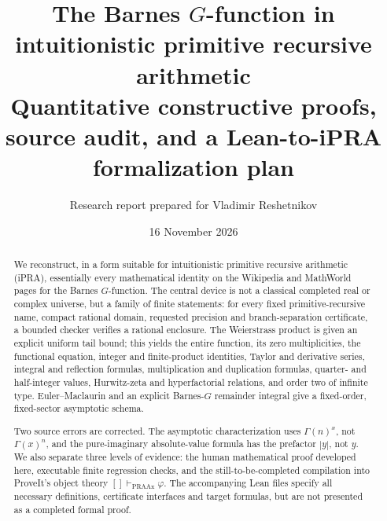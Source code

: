 \documentclass[11pt]{article}
\title{\textbf{The Barnes $G$-function in intuitionistic primitive recursive arithmetic}\\
\large Quantitative constructive proofs, source audit, and a Lean-to-iPRA formalization plan}
\author{Research report prepared for Vladimir Reshetnikov}
\date{16 November 2026}
\begin{document}
\maketitle

\begin{abstract}
We reconstruct, in a form suitable for intuitionistic primitive recursive
arithmetic (iPRA), essentially every mathematical identity on the Wikipedia and
MathWorld pages for the Barnes $G$-function.  The central device is not a
classical completed real or complex universe, but a family of finite statements:
for every fixed primitive-recursive name, compact rational domain, requested
precision and branch-separation certificate, a bounded checker verifies a
rational enclosure.  The Weierstrass product is given an explicit uniform tail
bound; this yields the entire function, its zero multiplicities, the functional
equation, integer and finite-product identities, Taylor and derivative series,
integral and reflection formulas, multiplication and duplication formulas,
quarter- and half-integer values, Hurwitz-zeta and hyperfactorial relations,
and order two of infinite type.  Euler--Maclaurin and an explicit Barnes-$G$
remainder integral give a fixed-order, fixed-sector asymptotic schema.

Two source errors are corrected.  The asymptotic characterization uses
$\Gamma(n)^x$, not $\Gamma(x)^n$, and the pure-imaginary absolute-value formula
has the prefactor $|y|$, not $y$.  We also separate three levels of evidence:
the human mathematical proof developed here, executable finite regression
checks, and the still-to-be-completed compilation into ProveIt's object theory
$[]\vdash_{\mathrm{PRAAx}}\varphi$.  The accompanying Lean files specify all
necessary definitions, certificate interfaces and target formulas, but are not
presented as a completed formal proof.
\end{abstract}

\tableofcontents
\newpage















\end{document}
